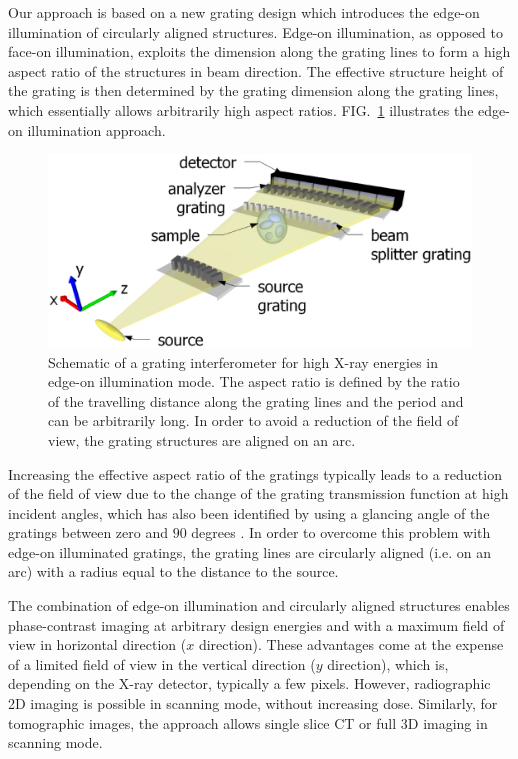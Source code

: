 \documentclass[aip,apl,amsmath,amssymb,floatfix,reprint,a4paper]{revtex4-1}
\begin{document}
Our approach is based on a new grating design which introduces the edge-on illumination of circularly aligned structures. Edge-on illumination, as opposed to face-on illumination, exploits the dimension along the grating lines to form a high aspect ratio of the structures in beam direction. The effective structure height of the grating is then determined by the grating dimension along the grating lines, which essentially allows arbitrarily high aspect ratios. FIG.~\ref{Fig:schematic} illustrates the edge-on illumination approach.
\begin{figure} [ht]
  \includegraphics[width = \linewidth]{figures/figure1.eps}
  \caption{Schematic of a grating interferometer for high X-ray energies in edge-on illumination mode. The aspect ratio is defined by the ratio of the travelling distance along the grating lines and the period and can be arbitrarily long. In order to avoid a reduction of the field of view, the grating structures are aligned on an arc.}
  \label{Fig:schematic}
\end{figure}

Increasing the effective aspect ratio of the gratings typically leads to a reduction of the field of view due to the change of the grating transmission function at high incident angles, which has also been identified by using a glancing angle of the gratings between zero and $90$ degrees \cite{Stutman2012a}. In order to overcome this problem with edge-on illuminated gratings, the grating lines are circularly aligned (i.e. on an arc) with a radius equal to the distance to the source.

The combination of edge-on illumination and circularly aligned structures enables phase-contrast imaging at arbitrary design energies and with a maximum field of view in horizontal direction ($x$ direction). These advantages come at the expense of a limited field of view in the vertical direction ($y$ direction), which is, depending on the X-ray detector, typically a few pixels. However, radiographic 2D imaging is possible in scanning mode, without increasing dose. Similarly, for tomographic images, the approach allows single slice CT or full 3D imaging in scanning mode.
\end{document}
